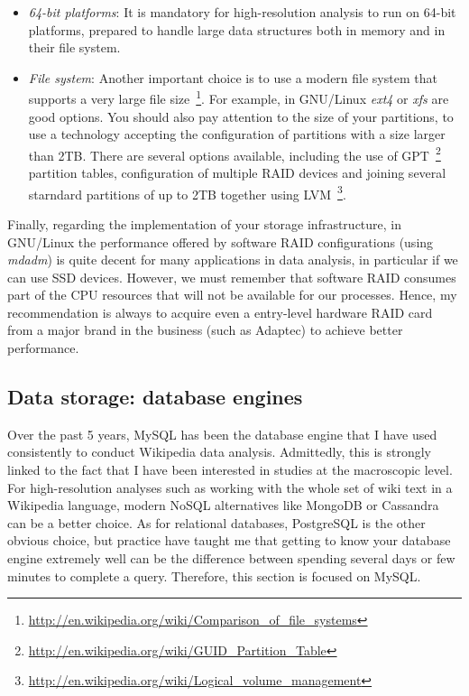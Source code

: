 \begin{itemize}
 \item \textit{64-bit platforms}: It is mandatory for high-resolution analysis to
run on 64-bit platforms, prepared to handle large data structures both in memory and
in their file system.
 \item \textit{File system}: Another important choice is to use a modern file system
that supports a very large file size~\footnote{\url{http://en.wikipedia.org/wiki/Comparison_of_file_systems}}.
For example, in GNU/Linux \textit{ext4} or \textit{xfs} are good options. You should
also pay attention to the size of your partitions, to use a technology accepting
the configuration of partitions with a size larger than 2TB. There are several
options available, including the use of GPT~\footnote{\url{http://en.wikipedia.org/wiki/GUID_Partition_Table}}
partition tables, configuration of multiple RAID devices and joining several
starndard partitions of up to 2TB together using LVM~\footnote{\url{http://en.wikipedia.org/wiki/Logical_volume_management}}.
\end{itemize}

Finally, regarding the implementation of your storage infrastructure, in GNU/Linux
the performance offered by software RAID configurations (using \textit{mdadm}) is
quite decent for many applications in data analysis, in particular if we can use
SSD devices. However, we must remember that software RAID consumes part of the CPU
resources that will not be available for our processes. Hence, my recommendation is
always to acquire even a entry-level hardware RAID card from a major brand in the
business (such as Adaptec) to achieve better performance.


\subsection{Data storage: database engines}
Over the past 5 years, MySQL has been the database engine that I have used consistently
to conduct Wikipedia data analysis. Admittedly, this is strongly linked to the
fact that I have been interested in studies at the macroscopic level. For high-resolution 
analyses such as working with the whole set of wiki text in a Wikipedia
language, modern NoSQL alternatives like MongoDB or Cassandra can be a better
choice. As for relational databases, PostgreSQL is the other obvious choice, but
practice have taught me that getting to know your database engine extremely
well can be the difference between spending several days or few minutes to complete
a query. Therefore, this section is focused on MySQL.


